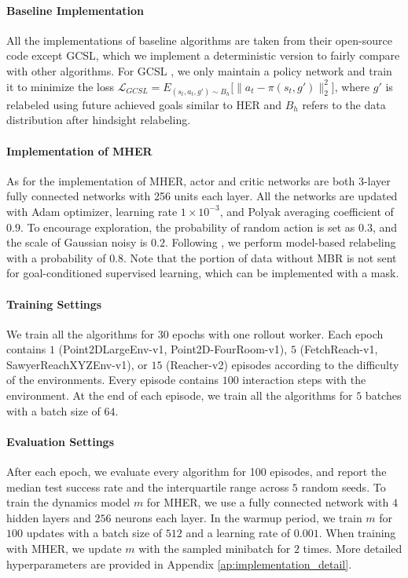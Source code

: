 \documentclass{article}
\begin{document}
\paragraph{Baseline Implementation}All the implementations of baseline algorithms are taken from their open-source code except GCSL, which we implement a deterministic version to fairly compare with other algorithms. For GCSL \cite{ghosh2021learning}, we only maintain a policy network and train it to minimize the loss $\mathcal{L}_{GCSL} = E_{(s_t,a_t,g') \sim B_h} \big[\|a_t - \pi(s_t,g')\|_2^2 \big]$, where $g'$ is relabeled using future achieved goals similar to HER and $B_h$ refers to the data distribution after hindsight relabeling.

\paragraph{Implementation of MHER}As for the implementation of MHER, actor and critic networks are both 3-layer fully connected networks with 256 units each layer. All the networks are updated with Adam optimizer, learning rate $1\times 10^{-3}$, and Polyak averaging coefficient of $0.9$. To encourage exploration, the probability of random action is set as $0.3$, and the scale of Gaussian noisy is $0.2$. Following \cite{andrychowicz2017hindsight,fang2019curriculum}, we perform model-based relabeling with a probability of $0.8$. Note that the portion of data without MBR is not sent for goal-conditioned supervised learning, which can be implemented with a mask.

\paragraph{Training Settings}We train all the algorithms for 30 epochs with one rollout worker. Each epoch contains $1$ (Point2DLargeEnv-v1, Point2D-FourRoom-v1), $5$ (FetchReach-v1, SawyerReachXYZEnv-v1), or $15$ (Reacher-v2) episodes according to the difficulty of the environments. Every episode contains $100$ interaction steps with the environment. At the end of each episode, we train all the algorithms for $5$ batches with a batch size of $64$. 

\paragraph{Evaluation Settings}After each epoch, we evaluate every algorithm for 100 episodes, and report the median test success rate and the interquartile range across $5$ random seeds. To train the dynamics model $m$ for MHER, we use a fully connected network with $4$ hidden layers and $256$ neurons each layer. In the warmup period, we train $m$ for $100$ updates with a batch size of $512$ and a learning rate of $0.001$. When training with MHER, we update $m$ with the sampled minibatch for $2$ times. More detailed hyperparameters are provided in Appendix \ref{ap:implementation_detail}.
\end{document}
